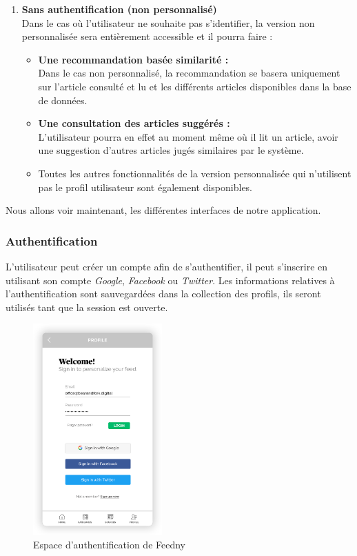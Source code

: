 \begin{enumerate}[leftmargin=*]
\item\textbf{Sans authentification (non personnalisé)}\\
Dans le cas où l'utilisateur ne souhaite pas s'identifier, la version non personnalisée sera entièrement accessible et il pourra faire :
\begin{itemize}
    \item \textbf{Une recommandation basée similarité :}\\
    Dans le cas non personnalisé, la recommandation se basera uniquement sur l'article consulté et lu et les différents articles disponibles dans la base de données.    
    \item \textbf{Une consultation des articles suggérés :}\\
    L’utilisateur pourra en effet au moment même où il lit un article, avoir une suggestion d'autres articles jugés similaires par le système.
    \item Toutes les autres fonctionnalités de la version personnalisée qui n'utilisent pas le profil utilisateur sont également disponibles.
\end{itemize}
\end{enumerate}
\vspace*{0.7cm}
Nous allons voir maintenant, les différentes interfaces de notre application.

\subsubsection{Authentification}
L'utilisateur peut créer un compte afin de s'authentifier, il peut s'inscrire en utilisant son compte \emph{Google}, \emph{Facebook} ou \emph{Twitter}.
Les informations relatives à l'authentification sont sauvegardées dans la collection des profils, ils seront utilisés tant que la session est ouverte.  
\begin{figure}[H]
    \centering
    \includegraphics[width=140pt]{img/chapter4/feedny/en-sigin.png}
    \caption{Espace d'authentification de \textquotedbl Feedny\textquotedbl}
    \label{}
\end{figure}


